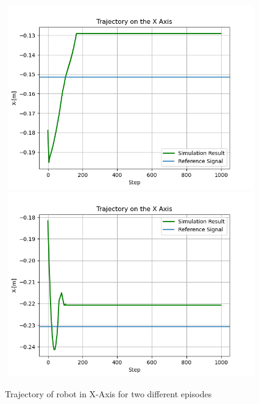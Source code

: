 \documentclass[12pt,twoside,a4]{mwbk}
\begin{document}
\begin{figure}[h!]
    \centering
    \includegraphics[width=11cm, height=8cm]{traj_x_2.png}
    \includegraphics[width=11cm, height=8cm]{traj_x.png}
    \caption{Trajectory of robot in X-Axis for two different episodes}
\end{figure}
\newpage
\end{document}
